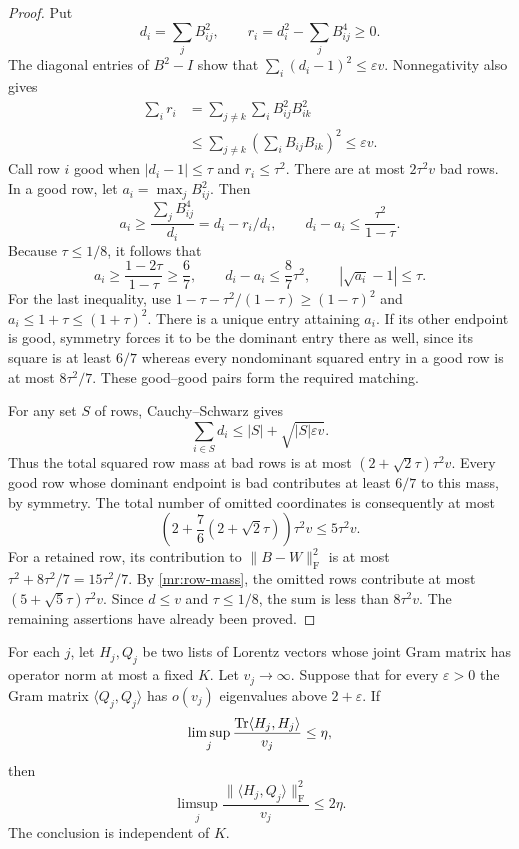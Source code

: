 \begin{proof}
Put
\[
 d_i=\sum_jB_{ij}^2,
 \qquad r_i=d_i^2-\sum_j B_{ij}^4\ge0.
\]
The diagonal entries of $B^2-I$ show that
$\sum_i(d_i-1)^2\le\varepsilon v$.  Nonnegativity also gives
\begin{align*}
 \sum_i r_i
 &=\sum_{j\ne k}\sum_iB_{ij}^2B_{ik}^2\\
 &\le\sum_{j\ne k}\left(\sum_iB_{ij}B_{ik}\right)^2
 \le\varepsilon v.
\end{align*}
Call row $i$ good when $|d_i-1|\le\tau$ and $r_i\le\tau^2$.
There are at most $2\tau^2v$ bad rows.  In a good row, let
$a_i=\max_j B_{ij}^2$.  Then
\[
 a_i\ge\frac{\sum_jB_{ij}^4}{d_i}
      =d_i-r_i/d_i,
 \qquad d_i-a_i\le\frac{\tau^2}{1-\tau}.
\]
Because $\tau\le1/8$, it follows that
\[
 a_i\ge\frac{1-2\tau}{1-\tau}\ge\frac67,
 \qquad d_i-a_i\le\frac87\tau^2,
 \qquad |\sqrt{a_i}-1|\le\tau.
\]
For the last inequality, use
$1-\tau-\tau^2/(1-\tau)\ge(1-\tau)^2$ and
$a_i\le1+\tau\le(1+\tau)^2$.
There is a unique entry attaining $a_i$.  If its other endpoint is
good, symmetry forces it to be the dominant entry there as well, since
its square is at least $6/7$ whereas every nondominant squared entry in
a good row is at most $8\tau^2/7$.  These good--good pairs form the
required matching.

For any set $S$ of rows, Cauchy--Schwarz gives
\begin{equation}\label{mr:row-mass}
 \sum_{i\in S}d_i
 \le |S|+\sqrt{|S|\varepsilon v}.
\end{equation}
Thus the total squared row mass at bad rows is at most
$(2+\sqrt2\tau)\tau^2v$.  Every good row whose dominant endpoint is
bad contributes at least $6/7$ to this mass, by symmetry.  The total
number of omitted coordinates is consequently at most
\[
 \left(2+\frac76(2+\sqrt2\tau)\right)\tau^2v
 \le5\tau^2v.
\]
For a retained row, its contribution to $\|B-W\|_{\mathrm F}^2$ is
at most $\tau^2+8\tau^2/7=15\tau^2/7$.  By
\eqref{mr:row-mass}, the omitted rows contribute at most
$(5+\sqrt5\tau)\tau^2v$.  Since $d\le v$ and $\tau\le1/8$, the
sum is less than $8\tau^2v$.  The remaining assertions have already
been proved.
\end{proof}

\begin{lemma}
\label{mr:trace-cross}
For each $j$, let $H_j,Q_j$ be two lists of Lorentz vectors whose joint
Gram matrix has operator norm at most a fixed $K$.  Let $v_j\to\infty$.
Suppose that for every $\varepsilon>0$ the Gram matrix
$\langle Q_j,Q_j\rangle$ has $o(v_j)$ eigenvalues above
$2+\varepsilon$.  If
\[
 \limsup_j\frac{\operatorname{Tr}\langle H_j,H_j\rangle}{v_j}\le\eta,
\]
then
\begin{equation}\label{mr:trace-cross-bound}
 \limsup_j\frac{\|\langle H_j,Q_j\rangle\|_{\mathrm F}^2}{v_j}
 \le2\eta.
\end{equation}
The conclusion is independent of $K$.
\end{lemma}

